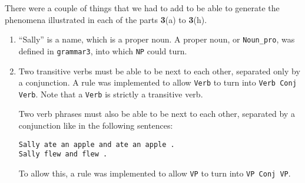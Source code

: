 \documentclass[11pt]{article}
\newcommand{\code}[1]{\texttt{#1}}
\begin{document}
\hspace{-22pt} There were a couple of things that we had to add to be able to generate the phenomena illustrated in each of the parts \textbf{3}(a) to \textbf{3}(h).
\begin{enumerate}
\item 
	``Sally'' is a name, which is a proper noun. A proper noun, or \code{Noun\_pro}, was defined in \code{grammar3}, into which \code{NP} could turn. 
\item 
	Two transitive verbs must be able to be next to each other, separated only by a conjunction. A rule was implemented to allow \code{Verb} to turn into \code{Verb Conj Verb}. Note that a \code{Verb} is strictly a transitive verb. 
	
	Two verb phrases must also be able to be next to each other, separated by a conjunction like in the following sentences:
	
	\code{Sally ate an apple and ate an apple .} \\
	\code{Sally flew and flew .}
	
	To allow this, a rule was implemented to allow \code{VP} to turn into \code{VP Conj VP}.
	

\end{enumerate}
\end{document}
